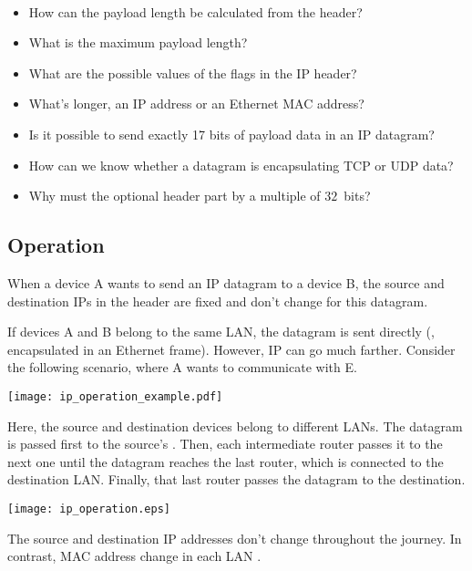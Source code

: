 \begin{exercise} \ \\[-0.5cm]
\begin{itemize}
\item How can the payload length be calculated from the header?
\item What is the maximum payload length?
\item What are the possible values of the flags in the IP header?
\item What's longer, an IP address or an Ethernet MAC address?
\item Is it possible to send exactly 17 bits of payload data in an IP datagram?
\item How can we know whether a datagram is encapsulating TCP or UDP data?
\item Why must the optional header part by a multiple of $32$~bits?
\end{itemize}
\end{exercise}

\subsection{Operation}

When a device A wants to send an IP datagram to a device B, the source and 
destination IPs in the header are fixed and don't change for this datagram.

If devices A and B belong to the same LAN, the datagram is sent directly
(\eg, encapsulated in an Ethernet frame). However, IP can go much farther.
Consider the following scenario, where A wants to communicate with E.

\begin{center}
 \texttt{[image: ip\_operation\_example.pdf]}
\end{center}


Here, the source and destination devices belong to different LANs.
The datagram is passed first to the source's .
Then, each intermediate router passes it to the next one until the datagram reaches 
the last router, which is connected to the destination LAN. Finally, that last router 
passes the datagram to the destination. 

\begin{center}
\texttt{[image: ip\_operation.eps]}
\end{center}

The source and destination IP addresses don't change throughout the journey.
In contrast, MAC address change in each LAN . 


